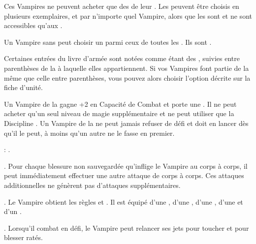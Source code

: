 
Ces Vampires ne peuvent acheter que des \bloodpowers{} de leur \bloodline{}. Les \bloodlinepowers{} peuvent être choisis en plusieurs exemplaires, et par n'importe quel Vampire, alors que les \ancientbloodpowers{} sont \oneofakind{} et ne sont accessibles qu'aux \vampirelords{}.


Un Vampire sans \bloodline{} peut choisir un \bloodlinepowers{} parmi ceux de toutes les \bloodlines{}. Ils sont \oneofakind{}.


Certaines entrées du livre d'armée sont notées comme étant des \bloodties{}, suivies entre parenthèses de la \bloodline{} à laquelle elles appartiennent. Si vos Vampires font partie de la même \bloodline{} que celle entre parenthèses, vous pouvez alors choisir l'option décrite sur la fiche d'unité.

\medskip

\separator


\noindent\parbox{\columnwidth}{
Un Vampire de la \brotherhood{} gagne +2 en Capacité de Combat et porte une \platearmour{}. Il ne peut acheter qu'un seul niveau de magie supplémentaire et ne peut utiliser que la Discipline \necromancy{}. Un Vampire de la \brotherhood{} ne peut jamais refuser de défi et doit en lancer dès qu'il le peut, à moins qu'un autre  ne le fasse en premier.

\bloodties{}: \vampireknights{}.
}

\startpricelist

 \textbf{\ancientbloodpower}. Pour chaque blessure non sauvegardée qu'inflige le Vampire au corps à corps, il peut immédiatement effectuer une autre attaque de corps à corps. Ces attaques additionnelles ne génèrent pas d'attaques supplémentaires.

 \textbf{\bloodlinepower}. Le Vampire obtient les règles \weaponmaster{} et . Il est équipé d'une \ahw{}, d'une \halberd{}, d'une \gw{}, d'une \lance{} et d'un \shield{}.

 \textbf{\bloodlinepower}. Lorsqu'il combat en défi, le Vampire peut relancer ses jets pour toucher et pour blesser ratés.


